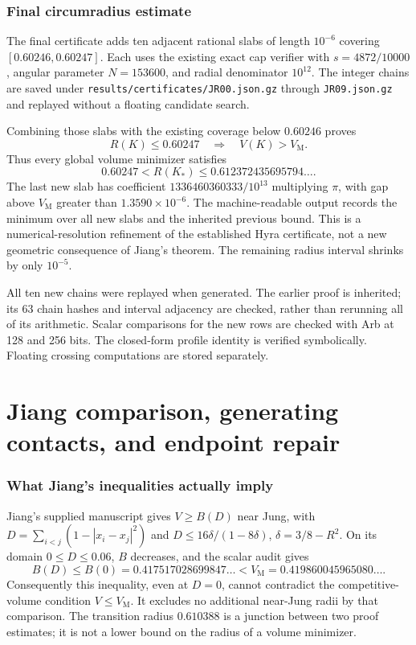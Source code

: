 \documentclass[11pt]{article}
\theoremstyle{remark}\newtheorem{remark}[theorem]{Remark}
\newcommand{\VM}{V_{\mathrm M}}
\begin{document}
\section{Final circumradius estimate}\label{radius:radiusfinal}
The final certificate adds ten
adjacent rational slabs of length $10^{-6}$ covering
$[0.60246,0.60247]$. Each uses the existing exact cap verifier with
$s=4872/10000$, angular parameter $N=153600$, and radial denominator
$10^{12}$. The integer chains are saved under
\texttt{results/certificates/JR00.json.gz} through \texttt{JR09.json.gz}
and replayed without a floating candidate search.

Combining those slabs with the existing coverage below $0.60246$ proves
\[
 \boxed{R(K)\leq0.60247\quad\Longrightarrow\quad V(K)>\VM.}
\]
Thus every global volume minimizer satisfies
\[
 0.60247<R(K_*)\leq0.612372435695794\ldots.
\]
The last new slab has coefficient
$1336460360333/10^{13}$ multiplying $\pi$, with gap above $\VM$
greater than $1.3590\times10^{-6}$. The machine-readable output records
the minimum over all new slabs and the inherited previous bound.
This is a numerical-resolution refinement of the established Hyra
certificate, not a new geometric consequence of Jiang's theorem.
The remaining radius interval shrinks by only $10^{-5}$.

All ten new chains were replayed when generated. The earlier proof is inherited; its 63 chain
hashes and interval adjacency are checked, rather than rerunning all of
its arithmetic. Scalar comparisons for the new rows are checked with
Arb at 128 and 256 bits. The closed-form profile identity is verified
symbolically. Floating crossing computations are stored separately.


\part{Jiang comparison, generating contacts, and endpoint repair}

\section{What Jiang's inequalities actually imply}
Jiang's supplied manuscript \cite{Jiang} gives $V\geq B(D)$ near Jung, with
$D=\sum_{i<j}(1-|x_i-x_j|^2)$ and
$D\leq16\delta/(1-8\delta)$, $\delta=3/8-R^2$.
On its domain $0\leq D\leq0.06$, $B$ decreases, and the scalar audit gives
\[
 B(D)\leq B(0)=0.417517028699847\ldots
 <\VM=0.419860045965080\ldots.
\]
Consequently this inequality, even at $D=0$, cannot contradict the
competitive-volume condition $V\leq\VM$. It excludes no additional
near-Jung radii by that comparison. The transition radius $0.610388$
is a junction between two proof estimates; it is not a lower bound on
the radius of a volume minimizer.
\end{document}
